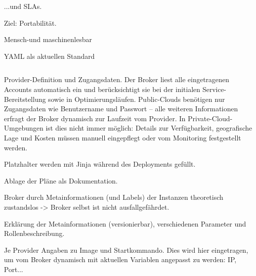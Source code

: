 


...und SLAs.

Ziel: Portabilität.

Mensch-und maschinenlesbar

YAML als aktuellen Standard

%
%
\begin{listing}[ht]	
	\inputminted[]{yaml}{./src/provider.sample.yaml}
	\caption{Provider-Definition und Zugangsdaten. Der Broker liest alle eingetragenen Accounts automatisch ein und berücksichtigt sie bei der initialen Service-Bereitstellung sowie in Optimierungsläufen. Public-Clouds benötigen nur Zugangsdaten wie Benutzername und Passwort -- alle weiteren Informationen erfragt der Broker dynamisch zur Laufzeit vom Provider. In Private-Cloud-Umgebungen ist dies nicht immer möglich: Details zur Verfügbarkeit, geografische Lage und Kosten müssen manuell eingepflegt oder vom Monitoring festgestellt werden.}
	\label{listing:provider}
\end{listing}



Platzhalter werden mit Jinja während des Deployments gefüllt.

Ablage der Pläne als Dokumentation.

Broker durch Metainformationen (und Labels) der Instanzen theoretisch zustandslos -> Broker selbst ist nicht ausfallgefährdet.

Erklärung der Metainformationen (versionierbar), verschiedenen Parameter und Rollenbeschreibung.

Je Provider Angaben zu Image und Startkommando. Dies wird hier eingetragen, um vom Broker dynamisch mit aktuellen Variablen angepasst zu werden: IP, Port...

